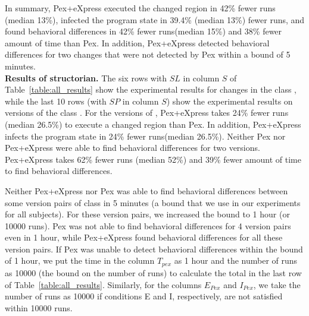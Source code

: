 In summary, Pex+eXpress executed the changed region in 42\% fewer runs (median 13\%), infected the program state in 39.4\% (median 13\%) fewer runs, and found behavioral differences in 42\% fewer runs(median 15\%) and 38\% fewer amount of time than Pex. In addition, Pex+eXpress detected  behavioral differences for two changes that were not detected by Pex within a bound of 5 minutes.
\\ \textbf{Results of structorian.} The six rows with $SL$ in column $S$ of Table~\ref{table:all_results} show the experimental results for changes in the class , 
 while the last 10 rows (with $SP$ in column $S$) show the experimental results on versions of the class . For the versions of , Pex+eXpress takes 24\% fewer runs (median 26.5\%) to execute a changed region than Pex. In addition, Pex+eXpress infects the program state in 24\% fewer runs(median 26.5\%). Neither Pex nor Pex+eXpress were able to find behavioral differences for two versions. Pex+eXpress takes 62\% fewer runs (median 52\%) and 39\% fewer amount of time to find behavioral differences. 
 
 	Neither Pex+eXpress nor Pex was able to find behavioral differences between some version pairs of class  in 5 minutes (a bound that we use in our experiments for all subjects). For these version pairs, we increased the bound to 1 hour (or 10000 runs). Pex was not able to find behavioral differences for 4 version pairs even in 1 hour, while Pex+eXpress found behavioral differences for all these version pairs. If Pex was unable to detect behavioral differences within the bound of 1 hour, we put the time in the column $T_{pex}$ as 1 hour 
 	and the number of runs as 10000 (the bound on the number of runs) to calculate the total in the last row of Table~\ref{table:all_results}. Similarly, for the columns $E_{Pex}$ and $I_{Pex}$, we take the number of runs as 10000 if conditions E and I, respectively, are not satisfied within 10000 runs.
 	
